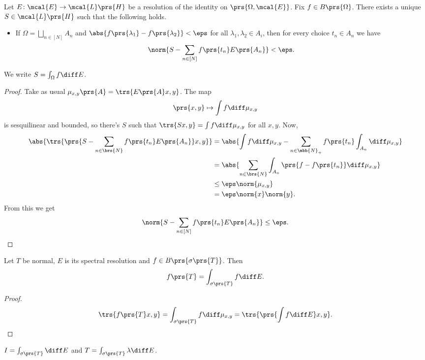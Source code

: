 \documentclass[10pt, twoside]{book}
\begin{document}
\begin{proposition}
Let $E \colon \mcal{E} \to \mcal{L}\prs{H}$ be a resolution of the identity on $\prs{\Omega, \mcal{E}}$. Fix $f \in B\prs{\Omega}$. There exists a unique $S \in \mcal{L}\prs{H}$ such that the following holds.
\begin{itemize}
\item If $\Omega = \bigsqcup_{n \in [N]} A_n$ and $\abs{f\prs{\lambda_1} - f\prs{\lambda_2}} < \eps$ for all $\lambda_1, \lambda_2 \in A_i$, then for every choice $t_n \in A_n$ we have
\[\norm{S - \sum_{n \in [N]} f\prs{t_n} E\prs{A_n}} < \eps \text{.}\]
\end{itemize}
We write $S = \int_\Omega f \diff E$.
\end{proposition}

\begin{proof}
Take as usual $\mu_{x,y} \prs{A} = \trs{E\prs{A} x, y}$.
The map
\[\prs{x,y} \mapsto \int f \diff \mu_{x,y}\]
is sesquilinear and bounded, so there's $S$ such that $\trs{S x, y} = \int f\diff\mu_{x,y}$ for all $x,y$.
Now,
\begin{align*}
\abs{\trs{\prs{S- \sum_{n \in \brs{N}} f\prs{t_n} E\prs{A_n}} x, y}} &=
\abs{\int f \diff \mu_{x,y} - \sum_{n \in \mbb{N}_+} f\prs{t_n} \int_{A_n} \diff \mu_{x,y}}
\\&= \abs{\sum_{n \in \brs{N}} \int_{A_n} \prs{f - f\prs{t_n}} \diff \mu_{x,y}}
\\&\leq \eps \norm{\mu_{x,y}}
\\&= \eps \norm{x} \norm{y} \text{.}
\end{align*}
From this we get
\[\norm{S - \sum_{n \in [N]} f\prs{t_n} E\prs{A_n}} \leq \eps \text{.}\]
\end{proof}

\begin{proposition}
Let $T$ be normal, $E$ is its spectral resolution and $f \in B\prs{\sigma\prs{T}}$. Then
\[f\prs{T} = \int_{\sigma\prs{T}} f \diff E \text{.}\]
\end{proposition}

\begin{proof}
\[\trs{f\prs{T} x , y} = \int_{\sigma\prs{T}} f \diff \mu_{x,y} = \trs{\prs{\int f \diff E} x, y} \text{.}\]
\end{proof}

\begin{corollary}
$I = \int_{\sigma\prs{T}} \diff E$ and $T = \int_{\sigma\prs{T}} \lambda \diff E$.
\end{corollary}
\end{document}
